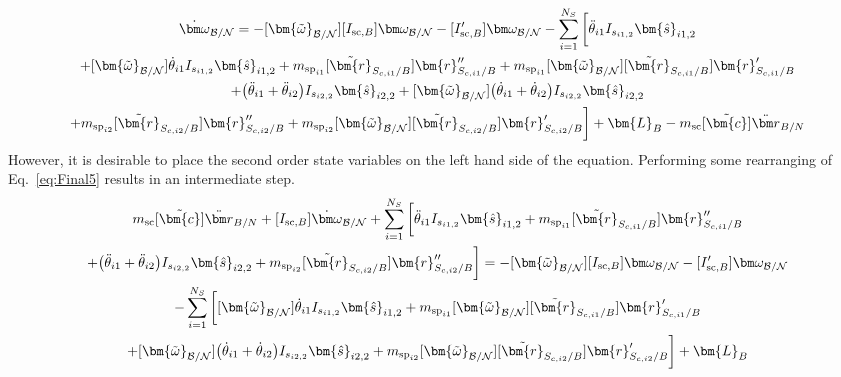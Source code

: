\begin{multline}
	[I_{\text{sc},B}] \dot{\bm\omega}_{\cal B/N} = -[\bm{\tilde{\omega}}_{\cal B/N}] [I_{\text{sc},B}] \bm\omega_{\cal B/N} - [I'_{\text{sc},B}] \bm\omega_{\cal B/N} -  \sum\limits_{i=1}^{N_S} \bigg[ \ddot{\theta}_{i1} I_{s_{i1,2}}\bm{\hat{s}}_{i1,2}\\
	+ [\bm{\tilde{\omega}}_{\cal B/N}] \dot{\theta}_{i1} I_{s_{i1,2}}\bm{\hat{s}}_{i1,2}
	+m_{\text{sp}_{i1}} [\tilde{\bm{r}}_{S_{c,i1}/B}] \bm{r}''_{S_{c,i1}/B}
	+m_{\text{sp}_{i1}} [\bm{\tilde{\omega}}_{\cal B/N}] [\tilde{\bm{r}}_{S_{c,i1}/B}] \bm{r}'_{S_{c,i1}/B}\\
	+\big(\ddot{\theta}_{i1}+\ddot{\theta}_{i2}\big) I_{s_{i2,2}}\bm{\hat{s}}_{i2,2}
	+ [\bm{\tilde{\omega}}_{\cal B/N}] \big(\dot{\theta}_{i1}+\dot{\theta}_{i2}\big) I_{s_{i2,2}}\bm{\hat{s}}_{i2,2} \\
	+m_{\text{sp}_{i2}} [\tilde{\bm{r}}_{S_{c,i2}/B}] \bm{r}''_{S_{c,i2}/B}
	+m_{\text{sp}_{i2}} [\bm{\tilde{\omega}}_{\cal B/N}] [\tilde{\bm{r}}_{S_{c,i2}/B}] \bm{r}'_{S_{c,i2}/B}\bigg]
	+ \bm{L}_B - m_{\text{sc}} [\tilde{\bm{c}}] \ddot{\bm r}_{B/N}
	\label{eq:Final5}
\end{multline}
However, it is desirable to place the second order state variables on the left hand side of the equation. Performing some rearranging of Eq.~\eqref{eq:Final5} results in an intermediate step.
\begin{multline}
	m_{\text{sc}} [\tilde{\bm{c}}] \ddot{\bm r}_{B/N} + [I_{\text{sc},B}] \dot{\bm\omega}_{\cal B/N} + \sum\limits_{i=1}^{N_S} \bigg[ \ddot{\theta}_{i1} I_{s_{i1,2}}\bm{\hat{s}}_{i1,2}
	+m_{\text{sp}_{i1}} [\tilde{\bm{r}}_{S_{c,i1}/B}] \bm{r}''_{S_{c,i1}/B}\\
	+\big(\ddot{\theta}_{i1}+\ddot{\theta}_{i2}\big) I_{s_{i2,2}}\bm{\hat{s}}_{i2,2}
	+m_{\text{sp}_{i2}} [\tilde{\bm{r}}_{S_{c,i2}/B}] \bm{r}''_{S_{c,i2}/B}\bigg] = -[\bm{\tilde{\omega}}_{\cal B/N}] [I_{\text{sc},B}] \bm\omega_{\cal B/N} - [I'_{\text{sc},B}] \bm\omega_{\cal B/N} \\
	-  \sum\limits_{i=1}^{N_S} \bigg[
	[\bm{\tilde{\omega}}_{\cal B/N}] \dot{\theta}_{i1} I_{s_{i1,2}}\bm{\hat{s}}_{i1,2}
	+m_{\text{sp}_{i1}} [\bm{\tilde{\omega}}_{\cal B/N}] [\tilde{\bm{r}}_{S_{c,i1}/B}] \bm{r}'_{S_{c,i1}/B}\\
	+ [\bm{\tilde{\omega}}_{\cal B/N}] \big(\dot{\theta}_{i1}+\dot{\theta}_{i2}\big) I_{s_{i2,2}}\bm{\hat{s}}_{i2,2}
	+m_{\text{sp}_{i2}} [\bm{\tilde{\omega}}_{\cal B/N}] [\tilde{\bm{r}}_{S_{c,i2}/B}] \bm{r}'_{S_{c,i2}/B}\bigg]
	+ \bm{L}_B
	\label{eq:Finalint}
\end{multline}
